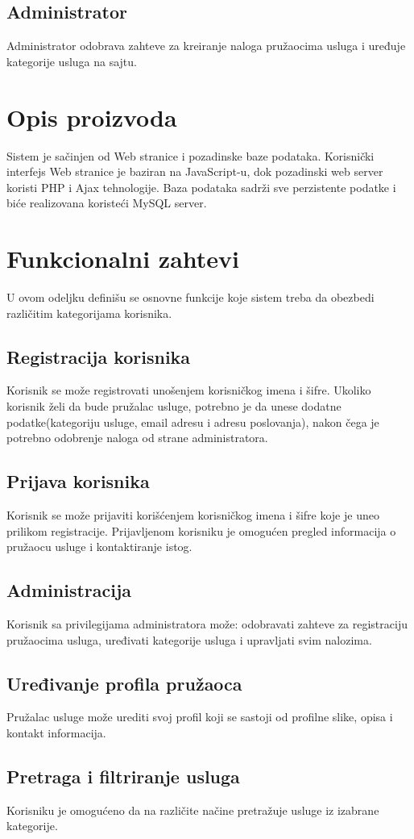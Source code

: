 \documentclass[a4paper,12pt]{report}
\begin{document}
\subsection{Administrator}
Administrator odobrava zahteve za kreiranje naloga pružaocima usluga i uređuje kategorije usluga na sajtu.
\section{Opis proizvoda}
Sistem je sačinjen od Web stranice i pozadinske baze podataka. Korisnički interfejs Web stranice je baziran na JavaScript-u, dok pozadinski web server koristi PHP i Ajax tehnologije. Baza podataka sadrži sve perzistente podatke i biće realizovana koristeći MySQL server.
\section{Funkcionalni zahtevi}
U ovom odeljku definišu se osnovne funkcije koje sistem treba da obezbedi različitim kategorijama korisnika.
\subsection{Registracija korisnika}
Korisnik se može registrovati unošenjem korisničkog imena i šifre. Ukoliko korisnik želi da bude pružalac usluge, potrebno je da unese dodatne podatke(kategoriju usluge, email adresu i adresu poslovanja), nakon čega je potrebno odobrenje naloga od strane administratora. 
\subsection{Prijava korisnika}
Korisnik se može prijaviti korišćenjem korisničkog imena i šifre koje je uneo prilikom registracije. Prijavljenom korisniku je omogućen pregled informacija o pružaocu usluge i kontaktiranje istog.
\subsection{Administracija}
Korisnik sa privilegijama administratora može: odobravati zahteve za registraciju pružaocima usluga, uređivati kategorije usluga i upravljati svim nalozima.
\subsection{Uređivanje profila pružaoca}
Pružalac usluge može urediti svoj profil koji se sastoji od profilne slike, opisa i kontakt informacija.

\subsection{Pretraga i filtriranje usluga}
Korisniku je omogućeno da na različite načine pretražuje usluge iz izabrane kategorije.
\end{document}
